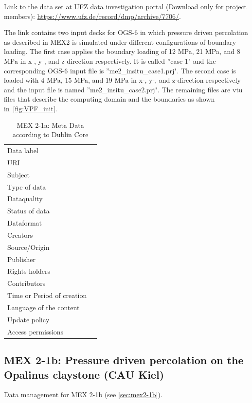 Link to the data set at UFZ data investigation portal (Download only for project members):
\hyperlink{https://www.ufz.de/record/dmp/archive/7706/}{https://www.ufz.de/record/dmp/archive/7706/}.

The link contains two input decks for OGS-6 in which pressure driven percolation as described in MEX2 is simulated under different configurations of boundary loading.
The first case applies the boundary loading of 12 MPa, 21 MPa, and 8 MPa in x-, y-, and z-direction respectively. It is called ''case 1" and the corresponding OGS-6 input file is ''me2\_insitu\_case1.prj".
The second case is loaded with 4 MPa, 15 MPa, and 19 MPa in x-, y-, and z-direction respectively and the input file is named ''me2\_insitu\_case2.prj".
The remaining files are vtu files that describe the computing domain and the boundaries as shown in~\ref{fig:VPF_init}.

\begin{table}[h!]
\caption{MEX 2-1a: Meta Data according to Dublin Core}
\label{tab:}
\small
\begin{tabular}{R{3cm}|L{7cm}}
\hline
%
Data label &  \\
URI &  \\
Subject  &  \\
Type of data  &  \\
Dataquality  &  \\
Status of data  &  \\
Dataformat  & \\
Creators  &  \\
Source/Origin &  \\
Publisher  &  \\
Rights holders &  \\
Contributors &  \\
Time or Period of creation &  \\
Language of the content &  \\
Update policy &  \\
Access permissions &  \\
%
\hline
\end{tabular}
\end{table}

\subsection{MEX 2-1b: Pressure driven percolation on the Opalinus claystone (CAU Kiel)}

Data management for MEX 2-1b (see \ref{sec:mex2-1b}).

